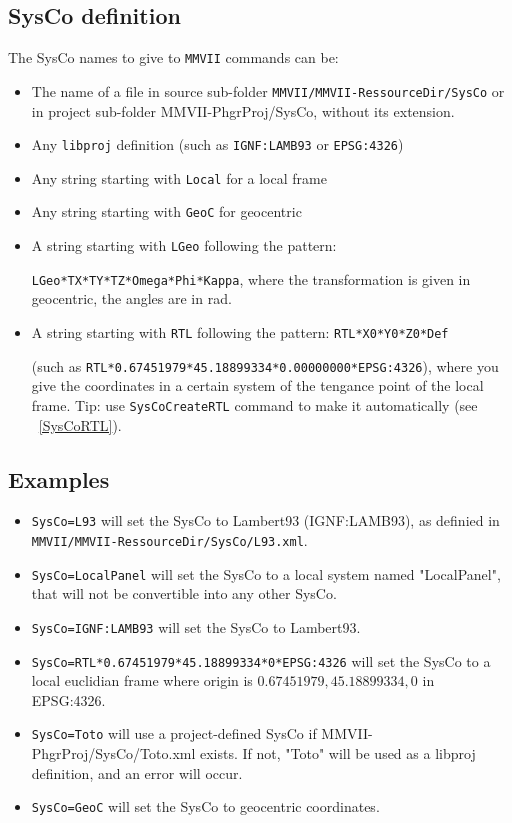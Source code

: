 \subsection{SysCo definition}
The SysCo names to give to {\tt MMVII} commands can be:
\begin{itemize}
\item The name of a file in source sub-folder {\tt MMVII/MMVII-RessourceDir/SysCo} or in project sub-folder {MMVII-PhgrProj/SysCo}, without its extension.
\item Any {\tt libproj} definition (such as {\tt IGNF:LAMB93} or {\tt EPSG:4326})
\item Any string starting with {\tt Local} for a local frame
\item Any string starting with {\tt GeoC} for geocentric
\item A string starting with {\tt LGeo} following the pattern:

{\tt LGeo*TX*TY*TZ*Omega*Phi*Kappa}, where the transformation is given in geocentric, the angles are in rad. 
\item A string starting with {\tt RTL} following the pattern: {\tt RTL*X0*Y0*Z0*Def}

(such as {\tt RTL*0.67451979*45.18899334*0.00000000*EPSG:4326}),
where you give the coordinates in a certain system of the tengance point of the local frame. Tip: use {\tt SysCoCreateRTL} command to make it automatically (see ~\ref{SysCoRTL}).

\end{itemize}


\subsection{Examples}
\begin{itemize}
\item {\tt SysCo=L93} will set the SysCo to Lambert93 (IGNF:LAMB93), as definied in \\
{\tt MMVII/MMVII-RessourceDir/SysCo/L93.xml}.
\item {\tt SysCo=LocalPanel} will set the SysCo to a local system named "LocalPanel", that will not be convertible into any other SysCo.
\item {\tt SysCo=IGNF:LAMB93} will set the SysCo to Lambert93.
\item {\tt SysCo=RTL*0.67451979*45.18899334*0*EPSG:4326} will set the SysCo to a local euclidian frame where origin is $0.67451979, 45.18899334, 0$ in EPSG:4326.
\item {\tt SysCo=Toto} will use a project-defined SysCo if {MMVII-PhgrProj/SysCo/Toto.xml} exists. If not, "Toto" will be used as a libproj definition, and an error will occur.
\item {\tt SysCo=GeoC} will set the SysCo to geocentric coordinates.

\end{itemize}


